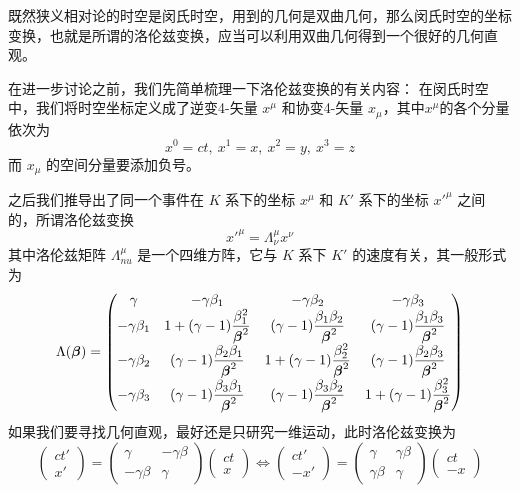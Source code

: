 \documentclass[12pt, a4paper, oneside]{ctexbook}
\begin{document}
既然狭义相对论的时空是闵氏时空，用到的几何是双曲几何，那么闵氏时空的坐标变换，也就是所谓的洛伦兹变换，应当可以利用双曲几何得到一个很好的几何直观。\par   
在进一步讨论之前，我们先简单梳理一下洛伦兹变换的有关内容： 
在闵氏时空中，我们将时空坐标定义成了逆变4-矢量 $x^{\mu}$ 和协变4-矢量 $x_{\mu}$，其中$x^{\mu}$的各个分量依次为
\begin{equation}
	x^{0}=ct,\ x^{1}=x,\ x^{2}=y,\ x^{3}=z
\end{equation}
而 $x_{\mu}$ 的空间分量要添加负号。\par   
之后我们推导出了同一个事件在 $K$ 系下的坐标 $x^{\mu}$ 和 $K'$ 系下的坐标 $x'^{\mu}$ 之间的，所谓洛伦兹变换
\begin{equation}
	x'^{\mu}=\Lambda^{\mu}_{\nu}x^{\nu}
\end{equation}
其中洛伦兹矩阵 $\Lambda_{nu}^{\mu}$ 是一个四维方阵，它与 $K$ 系下 $K'$ 的速度有关，其一般形式为
\begin{equation}
	\Lambda(\vb*{\beta})=\begin{pmatrix}
		\gamma & -\gamma\beta_{1} & -\gamma\beta_{2} & -\gamma\beta_{3} \\
		-\gamma\beta_{1} & 1+(\gamma-1)\dfrac{\beta_{1}^{2}}{\vb*{\beta}^{2}} & (\gamma-1)\dfrac{\beta_{1}\beta_{2}}{\vb*{\beta}^{2}} & (\gamma-1)\dfrac{\beta_{1}\beta_{3}}{\vb*{\beta}^{2}} \\
		-\gamma\beta_{2} & (\gamma-1)\dfrac{\beta_{2}\beta_{1}}{\vb*{\beta}^{2}} & 1+(\gamma-1)\dfrac{\beta_{2}^{2}}{\vb*{\beta}^{2}} & (\gamma-1)\dfrac{\beta_{2}\beta_{3}}{\vb*{\beta}^{2}} \\
		-\gamma\beta_{3} & (\gamma-1)\dfrac{\beta_{3}\beta_{1}}{\vb*{\beta}^{2}} & (\gamma-1)\dfrac{\beta_{3}\beta_{2}}{\vb*{\beta}^{2}} & 1+(\gamma-1)\dfrac{\beta_{3}^{2}}{\vb*{\beta}^{2}}
	\end{pmatrix}
\end{equation}
如果我们要寻找几何直观，最好还是只研究一维运动，此时洛伦兹变换为
\begin{equation}
	\begin{pmatrix}
		ct' \\ x'
	\end{pmatrix}=
	\begin{pmatrix}
		\gamma & -\gamma\beta \\
		-\gamma\beta & \gamma
	\end{pmatrix}\begin{pmatrix}
		ct \\ x
	\end{pmatrix}\Leftrightarrow
	\begin{pmatrix}
		ct' \\ -x'
	\end{pmatrix}=
	\begin{pmatrix}
		\gamma & \gamma\beta \\
		\gamma\beta & \gamma
	\end{pmatrix}\begin{pmatrix}
		ct \\ -x
	\end{pmatrix}
\end{equation}
\end{document}

